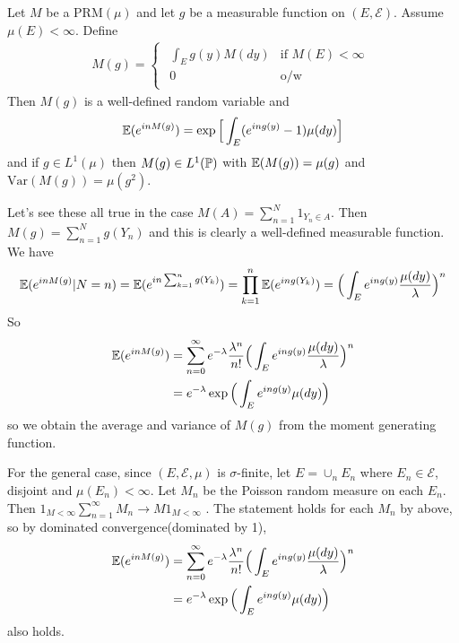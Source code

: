 \documentclass[12pt,a4paper]{report}
\newenvironment{proof}
{\begin{changemargin}{1cm}{0.5cm} 
	}%
	{\end{changemargin}
}
\begin{document}
 Let $M$ be a $\text{PRM}(\mu)$ and let $g$ be a measurable function on $(E, \mathscr{E})$. Assume $\mu(E) < \infty$. Define
\begin{align*}
M(g) = \begin{cases}
\begin{array}{ll}
\int_E g(y) M(dy) & \text{if  } M(E) < \infty \\
0 & \text{o/w}
\end{array}
\end{cases}
\end{align*}
Then $M(g)$ is a well-defined random variable and 
\begin{align*}
\mathbb{E}(e^{inM(g)}) = \exp \Big[ \int_E (e^{ing(y)} -1) \mu(dy) \Big]
\end{align*}
and if $g\in L^1(\mu)$ then $M(g) \in L^1(\mathbb{P})$ with $\mathbb{E}(M(g)) = \mu(g)$ and $\text{Var}(M(g)) = \mu(g^2)$.
\begin{proof}
\pf Let's see these all true in the case $M(A) = \sum_{n=1}^N 1_{Y_n \in A}$. Then $M(g) = \sum_{n=1}^N g(Y_n)$ and this is clearly a well-defined measurable function. We have
\begin{align*}
\mathbb{E}(e^{in M(g)} | N=n) = \mathbb{E}( e^{in \sum_{k=1}^n g(Y_k) }) =\prod_{k=1}^n \mathbb{E}( e^{in  g(Y_k) }) = \Big( \int_E e^{in g(y)} \frac{\mu(dy)}{\lambda} \Big)^n
\end{align*}
So 
\begin{align*}
\mathbb{E}(e^{in M(g)}) &= \sum_{n=0}^{\infty} e^{-\lambda} \frac{\lambda^n}{n!} \Big( \int_E e^{ing(y)} \frac{\mu(dy)}{\lambda} \Big)^n \\
&= e^{-\lambda} \exp \Big( \int_E e^{ing(y)} \mu(dy) \Big)
\end{align*}
so we obtain the average and variance of $M(g)$ from the moment generating function.

\quad For the general case, since $(E, \mathscr{E},\mu)$ is $\sigma$-finite, let $E = \cup_n E_n$ where $E_n \in \mathscr{E}$, disjoint and $\mu(E_n) < \infty$. Let $M_n$ be the Poisson random measure on each $E_n$. Then $1_{M<\infty} \sum_{n=1}^{\infty} M_{n} \rightarrow M 1_{M<\infty}$ . The statement holds for each $M_n$ by above, so by dominated convergence(dominated by 1),
\begin{align*}
\mathbb{E}(e^{in M(g)}) &= \sum_{n=0}^{\infty} e^{-\lambda} \frac{\lambda^n}{n!} \Big( \int_E e^{ing(y)} \frac{\mu(dy)}{\lambda} \Big)^n \\
&= e^{-\lambda} \exp \Big( \int_E e^{ing(y)} \mu(dy) \Big)
\end{align*}
also holds.

\eop
\end{proof}
\s
\end{document}
